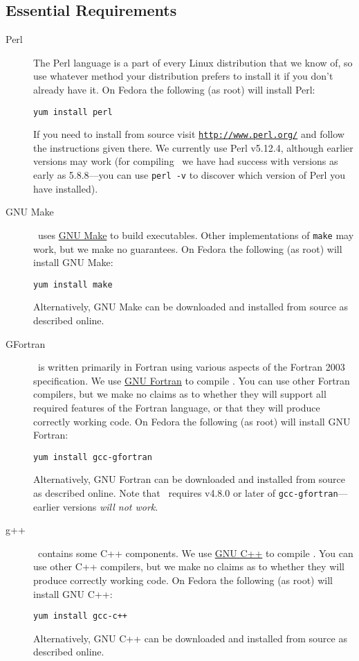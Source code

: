 \subsection{Essential Requirements}\label{sec:requirementsEssential}

\begin{description}
 \item [Perl] The Perl language is a part of every Linux distribution that we know of, so use whatever method your distribution prefers to install it if you don't already have it. On Fedora the following (as root) will install Perl:
\begin{verbatim}
yum install perl
\end{verbatim}
If you need to install from source visit \href{http://www.perl.org/}{\tt http://www.perl.org/} and follow the instructions given there. We currently use Perl v5.12.4, although earlier versions may work (for compiling \glc\ we have had success with versions as early as 5.8.8---you can use {\tt perl -v} to discover which version of Perl you have installed).

\item [GNU Make] \glc\ uses \href{http://www.gnu.org/software/make/}{GNU Make} to build executables. Other implementations of {\tt make} may work, but we make no guarantees. On Fedora the following (as root) will install GNU Make:
\begin{verbatim}
yum install make
\end{verbatim}
Alternatively, GNU Make can be downloaded and installed from source as described online.

\item [GFortran] \glc\ is written primarily in Fortran using various aspects of the Fortran 2003 specification. We use \href{http://gcc.gnu.org/fortran/}{GNU Fortran} to compile \glc. You can use other Fortran compilers, but we make no claims as to whether they will support all required features of the Fortran language, or that they will produce correctly working code. On Fedora the following (as root) will install GNU Fortran:
\begin{verbatim}
yum install gcc-gfortran
\end{verbatim}
Alternatively, GNU Fortran can be downloaded and installed from source as described online. Note that \glc\ requires v4.8.0 or later of {\tt gcc-gfortran}---earlier versions \emph{will not work}.

\item [g++] \glc\ contains some C++ components. We use \href{http://gcc.gnu.org/projects/cxx0x.html}{GNU C++} to compile \glc. You can use other C++ compilers, but we make no claims as to whether they will produce correctly working code. On Fedora the following (as root) will install GNU C++:
\begin{verbatim}
yum install gcc-c++
\end{verbatim}
Alternatively, GNU C++ can be downloaded and installed from source as described online.


\end{description}
